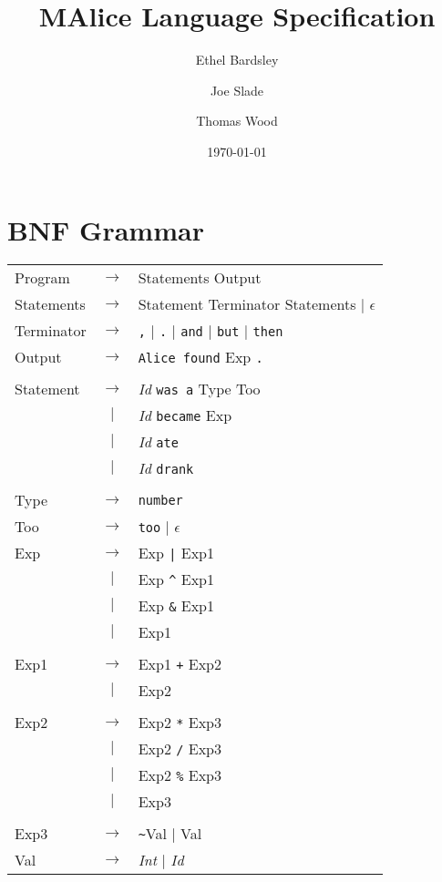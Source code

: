 \documentclass[a4wide, 11pt]{article}
\begin{document}
\title{MAlice Language Specification}

\author{Ethel Bardsley \and Joe Slade \and Thomas Wood}

\date{\today}         %

\maketitle            %

\section{BNF Grammar} 
\begin{tabular}{lcl}
Program     & $\to$ & Statements Output \\
Statements  & $\to$ & Statement Terminator Statements $|$ $\epsilon$ \\
Terminator  & $\to$ & \verb:,: $|$ \verb:.: $|$ \verb:and: $|$ \verb:but: $|$ \verb:then: \\
Output      & $\to$ & \verb:Alice found: Exp \verb:.: \\
\\
Statement   & $\to$ & \emph{Id} \verb|was a| Type Too \\
            &  $|$  & \emph{Id} \verb|became| Exp \\
            &  $|$  & \emph{Id} \verb|ate| \\
            &  $|$  & \emph{Id} \verb|drank| \\
\\
Type        & $\to$ & \verb|number| \\
Too         & $\to$ & \verb|too| $|$ $\epsilon$ \\
Exp         & $\to$ & Exp \verb:|: Exp1 \\
            &  $|$  & Exp \verb:^: Exp1 \\
            &  $|$  & Exp \verb:&: Exp1 \\
            &  $|$  & Exp1 \\
\\
Exp1        & $\to$ & Exp1 \verb:+: Exp2 \\
            &  $|$  & Exp2 \\
\\
Exp2        & $\to$ & Exp2 \verb:*: Exp3 \\
            &  $|$  & Exp2 \verb:/: Exp3 \\
            &  $|$  & Exp2 \verb:%: Exp3 \\
            &  $|$  & Exp3 \\
\\
Exp3        & $\to$ & \verb:~:Val $|$ Val \\
Val         & $\to$ & \emph{Int} $|$ \emph{Id} \\
\end{tabular}
\end{document}

